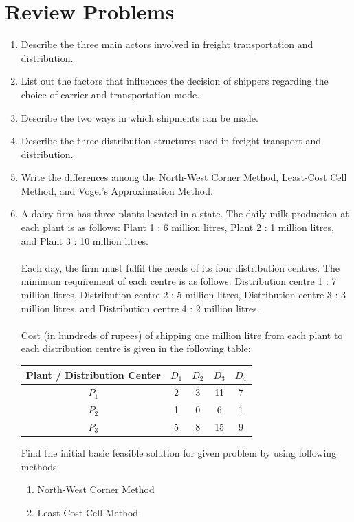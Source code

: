 \section{Review Problems}
\begin{enumerate}
	\item Describe the three main actors involved in freight transportation and distribution.
	\item List out the factors that influences the decision of shippers regarding the choice of carrier and transportation mode.
	\item Describe the two ways in which shipments can be made.
	\item Describe the three distribution structures used in freight transport and distribution.
	\item Write the differences among the North-West Corner Method, Least-Cost Cell Method, and Vogel's Approximation Method.
	\item A dairy firm has three plants located in a state. The daily milk production at each plant is as follows: Plant 1 : 6 million litres, Plant 2 : 1 million litres, and Plant 3 : 10 million litres.\\\\
	Each day, the firm must fulfil the needs of its four distribution centres. The minimum requirement of each centre is as follows: Distribution centre 1 : 7 million litres, Distribution centre 2 : 5 million litres, Distribution centre 3 : 3 million litres, and Distribution centre 4 : 2 million litres.\\\\
	Cost (in hundreds of rupees) of shipping one million litre from each plant to each distribution centre is given
	in the following table:
		\begin{center}
			\begin{tabular}{c | c | c | c | c}
				Plant / Distribution Center & $D_1$ & $D_2$ & $D_3$ & $D_4$\\
				\hline
				$P_1$ & 2 & 3 & 11 & 7\\
				\hline
				$P_2$ & 1 & 0 & 6 & 1 \\
				\hline
				$P_3$ & 5 & 8 & 15 & 9
			\end{tabular}
		\end{center}
	Find the initial basic feasible solution for given problem by using following methods:
		\begin{enumerate}
			\item North-West Corner Method
			\item Least-Cost Cell Method

\end{enumerate}
\end{enumerate}
